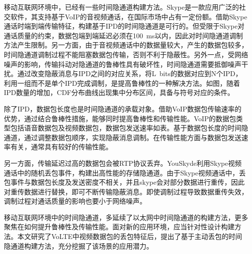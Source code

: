 移动互联网环境中，已经有一些时间隐通道构建方法。Skype是一款应用广泛的社交软件，其支持基于VoIP的音视频通话，在国际市场中占有一定份额。借助Skype通话时端到端传输特征，构建基于IPD的时间隐通道是可行的。但受限于Skype对通话质量的约束，数据包端到端延迟必须在{100\ ms}以内，因此对时间隐通道调制方法产生限制。另一方面，由于音视频通话中的数据量较大，产生的数据包较多，时间隐通道调制过程不能阻塞数据包传输，否则不利于隐蔽性。另外一点，受网络噪声的影响，传输抖动对隐通道的鲁棒性具有破坏性，时间隐通道需要抵御噪声干扰。通过改变隐蔽消息与IPD之间的对应关系，将{L\ bits}的数据对应到N个IPD，利用一组而不是单个IPD完成调制，是提高鲁棒性的一种解决方法。如图，随着IPD数量的增加，CDF分布曲线出现集中分布区间，具备与符号对应的条件。


除了IPD，数据包长度也是时间隐通道的承载对象。借助VoIP数据包传输速率的优势，通过结合鲁棒性措施，能够同时提高鲁棒性和传输性能。VoIP的数据包类型包括语音数据包及视频数据包，数据包发送速率如表。基于数据包长度的时间隐通道，通过调整数据包顺序，实现隐蔽消息调制。在传输性能方面与数据包发送速率有关，通常具有较好的传输性能。

另一方面，传输延迟过高的数据包会被RTP协议丢弃。YouSkyde利用Skype视频通话中的随机丢包事件，构建出高性能的存储隐通道。由于Skype视频通话中，丢包事件与数据包长度及发送密度不相关，并且skype会对部分数据进行重传，因此对重传数据进行替换，即可不断传输隐蔽消息。即使调制过程导致数据重传失效，调制过程对通话质量的影响也要小于网络噪声。

移动互联网环境中的时间隐通道，多延续了以太网中时间隐通道的构建方法，更多聚焦在如何提升鲁棒性及传输性能。面对新的应用环境，应当针对性设计构建方法。本文研究了VoLTE中视频数据包的丢包特征后，提出了基于主动丢包的时间隐通道构建方法，充分挖掘了该场景的应用潜力。

